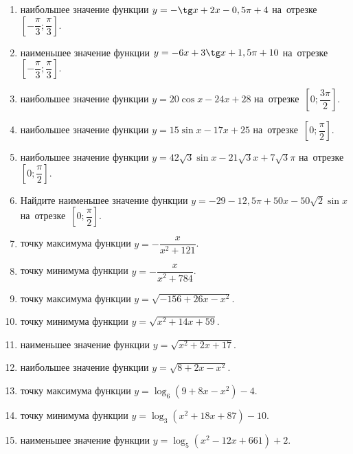 \documentclass[a4paper,10pt]{article}
\begin{document}
\begin{enumerate}
\item {} наибольшее значение функции $y=-\tg x +2x-0,5\pi +4$ на~отрезке~$\left[-\dfrac{\pi}{3};\dfrac{\pi}{3}\right]$.

\item {} наименьшее значение функции $y=-6x +3\tg x+1,5\pi+10$ на~отрезке~$\left[-\dfrac{\pi}{3};\dfrac{\pi}{3}\right]$.

\item {} наибольшее значение функции $y=20\cos x-24x+28$ на~отрезке~$\left[0;\dfrac{3\pi}{2}\right]$.

\item {} наибольшее значение функции $y=15\sin x-17x+25$ на~отрезке~$\left[0;\dfrac{\pi}{2}\right]$.

\item {} наибольшее значение функции $y=42\sqrt{3}\sin x-21\sqrt{3}x+7\sqrt{3}\pi $ на~отрезке~$\left[0;\dfrac{\pi}{2}\right]$.

\item Найдите наименьшее значение функции $y=-29-12,5\pi+50x-50\sqrt{2}\sin x$ на~отрезке~$\left[0;\dfrac{\pi}{2}\right]$.

\item {} точку максимума функции $y=-\dfrac{x}{ x^2 +121}$.

\item {} точку минимума функции $y=-\dfrac{x}{ x^2 +784}$.

\item {} точку максимума функции $y=\sqrt{-156+26x-x^2}$.

\item {} точку минимума функции $y=\sqrt{x^2+14x+59}$.

\item {} наименьшее значение функции $y=\sqrt{x^2+2x+17}$.

\item {} наибольшее значение функции $y=\sqrt{8+2x-x^2}$.

\item {} точку максимума функции $y=\log_6\left(9+8x-x^2\right)-4$.

\item {} точку минимума функции $y=\log_3\left(x^2+18x+87\right)-10$.

\item {} наименьшее значение функции $y=\log_5\left(x^2-12x+661\right)+2$.


\end{enumerate}
\end{document}
